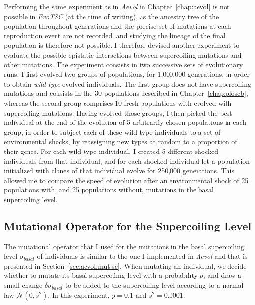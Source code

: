 Performing the same experiment as in \emph{Aevol} in Chapter~\ref{chap:aevol} is not possible in \emph{EvoTSC} (at the time of writing), as the ancestry tree of the population throughout generations and the precise set of mutations at each reproduction event are not recorded, and studying the lineage of the final population is therefore not possible.
I therefore devised another experiment to evaluate the possible epistatic interactions between supercoiling mutations and other mutations.
The experiment consists in two successive sets of evolutionary runs.
I first evolved two groups of populations, for 1,000,000 generations, in order to obtain \emph{wild-type} evolved individuals.
The first group does not have supercoiling mutations and consists in the 30 populations described in Chapter~\ref{chap:ploscb}, whereas the second group comprises 10 fresh populations with evolved with supercoiling mutations.
Having evolved those groups, I then picked the best individual at the end of the evolution of 5 arbitrarily chosen populations in each group, in order to subject each of these wild-type individuals to a set of environmental shocks, by reassigning new types at random to a proportion of their genes.
For each wild-type individual, I created 5 different shocked individuals from that individual, and for each shocked individual let a population initialized with clones of that individual evolve for 250,000 generations.
This allowed me to compare the speed of evolution after an environmental shock of 25 populations with, and 25 populations without, mutations in the basal supercoiling level.

\subsection{Mutational Operator for the Supercoiling Level}

The mutational operator that I used for the mutations in the basal supercoiling level $\sigma_{basal}$ of individuals is similar to the one I implemented in \emph{Aevol} and that is presented in Section~\ref{sec:aevol:mut-sc}.
When mutating an individual, we decide whether to mutate its basal supercoiling level with a probability $p$, and draw a small change $\delta\sigma_{basal}$ to be added to the supercoiling level according to a normal law $\mathcal{N}(0, s^2)$.
In this experiment, $p=0.1$ and $s^2=0.0001$.

